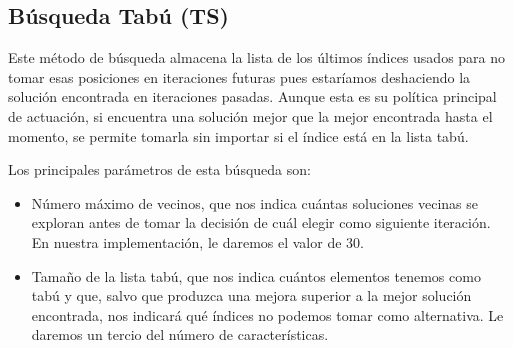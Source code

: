 \documentclass[a4paper, 11pt]{article}
\begin{document}
		\subsection{Búsqueda Tabú (\textbf{TS})}
			Este método de búsqueda almacena la lista de los últimos índices usados para no tomar
			esas posiciones en iteraciones futuras pues estaríamos deshaciendo la solución encontrada
			en iteraciones pasadas. Aunque esta es su política principal de actuación, si encuentra
			una solución mejor que la mejor encontrada hasta el momento, se permite tomarla sin
			importar si el índice está en la lista tabú.
			
			Los principales parámetros de esta búsqueda son:
			\begin{itemize}
				\item Número máximo de vecinos, que nos indica cuántas soluciones vecinas se exploran
				antes de tomar la decisión de cuál elegir como siguiente iteración. En nuestra
				implementación, le daremos el valor de 30.
				\item Tamaño de la lista tabú, que nos indica cuántos elementos tenemos como tabú y
				que, salvo que produzca una mejora superior a la mejor solución encontrada, nos indicará
				qué índices no podemos tomar como alternativa. Le daremos un tercio del número de
				características.
			\end{itemize}
		
\end{document}
